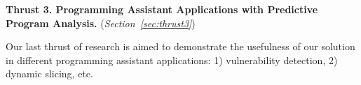 \vspace{3pt}
\noindent \textbf{Thrust 3. Programming Assistant Applications with Predictive Program Analysis.}  ({\em Section~\ref{sec:thrust3}})


Our last thrust of research is aimed to demonstrate the usefulness of
our solution in different programming assistant applications: 1)
vulnerability detection, 2) dynamic slicing,  etc.












